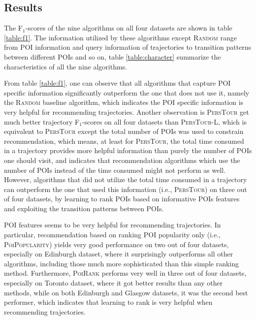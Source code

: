 \subsection{Results}
The F$_1$-scores of the nine algorithms on all four datasets are shown in table \ref{table:f1}.
The information utilized by these algorithms except \textsc{Random} range from POI information and query information 
of trajectories to transition patterns between different POIs and so on, table \ref{table:character} summarize the 
characteristics of all the nine algorithms.

From table \ref{table:f1}, one can observe that all algorithms that capture POI specific information significantly 
outperform the one that does not use it, namely the \textsc{Random} baseline algorithm, 
which indicates the POI specific information is very helpful for recommending trajectories.
%
Another observation is \textsc{PersTour} get much better trajectory F$_1$-scores on all four datasets 
than \textsc{PersTour-L}, which is equivalent to \textsc{PersTour} except the total number of POIs was used to 
constrain recommendation, which means, at least for \textsc{PersTour}, the total time consumed in a trajectory
provides more helpful information than purely the number of POIs one should visit, and indicates that recommendation
algorithms which use the number of POIs instead of the time consumed might not perform as well.
%
However, algorithms that did not utilize the total time consumed in a trajectory can outperform the one that 
used this information (i.e., \textsc{PersTour}) on three out of four datasets, 
by learning to rank POIs based on informative POIs features and exploiting the transition patterns between POIs.

POI features seems to be very helpful for recommending trajectories.
In particular, recommendation based on ranking POI popularity only 
(i.e., \textsc{PoiPopularity}) yields very good performance on two out of four datasets, 
especially on Edinburgh dataset, where it surprisingly outperforms all 
other algorithms, including those much more sophisticated than this simple ranking method.
%
Furthermore, \textsc{PoiRank} performs very well in three out of four datasets, 
especially on Toronto dataset, where it got better results than any other methods, 
while on both Edinburgh and Glasgow datasets, it was the second best performer, 
which indicates that learning to rank is very helpful when recommending trajectories.

